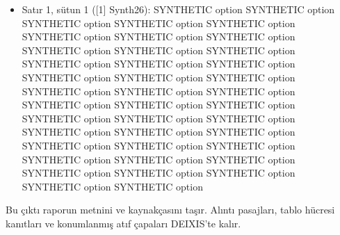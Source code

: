\documentclass[journal]{IEEEtran}
\begin{document}
\begin{itemize}
\item[1.] Satır 1, sütun 1 ([1] Synth26): SYNTHETIC option SYNTHETIC option SYNTHETIC option SYNTHETIC option SYNTHETIC option SYNTHETIC option SYNTHETIC option SYNTHETIC option SYNTHETIC option SYNTHETIC option SYNTHETIC option SYNTHETIC option SYNTHETIC option SYNTHETIC option SYNTHETIC option SYNTHETIC option SYNTHETIC option SYNTHETIC option SYNTHETIC option SYNTHETIC option SYNTHETIC option SYNTHETIC option SYNTHETIC option SYNTHETIC option SYNTHETIC option SYNTHETIC option SYNTHETIC option SYNTHETIC option SYNTHETIC option SYNTHETIC option SYNTHETIC option SYNTHETIC option SYNTHETIC option SYNTHETIC option SYNTHETIC option SYNTHETIC option SYNTHETIC option SYNTHETIC option SYNTHETIC option SYNTHETIC option
\end{itemize}

Bu çıktı raporun metnini ve kaynakçasını taşır. Alıntı pasajları, tablo hücresi kanıtları ve konumlanmış atıf çapaları DEIXIS'te kalır.




\end{document}
